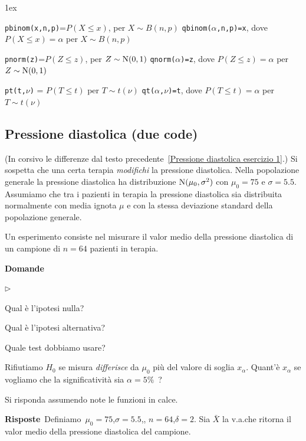 \documentclass[11pt,openany]{book}
\newcommand{\mylabel}[1]{{\footnotesize\textsf{#1}}\hfill}
\renewenvironment{itemize}
  {\begin{list}{$\triangleright$}{%
   \setlength{\parskip}{0mm}
   \setlength{\topsep}{.2\baselineskip}
   \setlength{\rightmargin}{0mm}
   \setlength{\listparindent}{0mm}
   \setlength{\itemindent}{0mm}
   \setlength{\labelwidth}{3ex}
   \setlength{\itemsep}{.4\baselineskip}
   \setlength{\parsep}{0mm}
   \setlength{\partopsep}{0mm}
   \setlength{\labelsep}{1ex}
   \setlength{\leftmargin}{\labelwidth+\labelsep}
   \let\makelabel\mylabel}}{%
   \end{list}\vspace*{-1.3mm}}
\begin{document}
\vfill
\parskip1ex
{\hrulefill\scriptsize

{\tt pbinom(x,n,p)}=$P(X\le x)$, per $X\sim B(n,p)$
\hfill 
{\tt qbinom($\alpha$,n,p)=x},  dove $P(X\le x)=\alpha$ per $X\sim B(n,p)$

{\tt pnorm(z)}=$P(Z\le z)$, per $Z\sim {\rm N}(0,1)$
\hfill 
{\tt qnorm($\alpha$)=z},  dove $P(Z\le z)=\alpha$ per $Z\sim {\rm N}(0,1)$

{\tt pt(t,$\nu$)} = $P(T\le t)$ per $T\sim t(\nu)$
\hfill
{\tt qt($\alpha$,$\nu$)=t}, dove $P(T\le t)=\alpha$ per $T\sim t(\nu)$

}

\clearpage\subsection{Pressione diastolica (due code)}
\label{Pressione diastolica due code}

(In corsivo le differenze dal testo precedente~\ref{Pressione diastolica esercizio 1}.) 
Si sospetta che una certa terapia \textit{modifichi} la pressione diastolica. Nella popolazione generale la pressione diastolica ha distribuzione ${\rm N}(\mu_0,\sigma^2)$ con $\mu_0=75$ e $\sigma=5.5$. Assumiamo che tra i pazienti in terapia la pressione diastolica sia distribuita normalmente con media ignota $\mu$ e con la stessa deviazione standard della popolazione generale. 

Un esperimento consiste nel misurare il valor medio della pressione diastolica di un campione di $n=64$ pazienti in terapia.

\textbf{Domande}

\begin{itemize}
\item[1.] Qual è l'ipotesi nulla?
\item[2.] Qual è l'ipotesi alternativa?
\item[3.] Quale test dobbiamo usare?
\item[4.] Rifiutiamo $H_0$ se misura \textit{differisce} da $\mu_0$ più del valore di soglia $x_\alpha$. Quant'è $x_\alpha$ se vogliamo che la significatività sia  $\alpha=5\%$~?
\end{itemize}
Si risponda assumendo note le funzioni in calce.

\textbf{Risposte}\  Definiamo\ $\mu_0=75$,\quad $\sigma=5.5$,\quad, $n=64$,\quad $\delta=2$. Sia $\bar X$ la v.a.\@ che ritorna il valor medio della pressione diastolica del campione.
\end{document}
